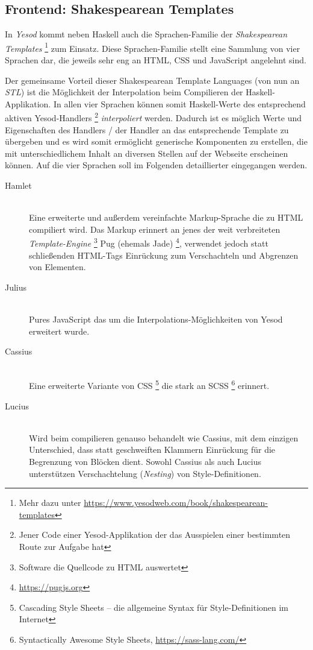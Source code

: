 \documentclass[11pt,a4paper,twoside,ngerman]{article}
\begin{document}
\subsection{Frontend: Shakespearean Templates}
In \emph{Yesod} kommt neben Haskell auch die Sprachen-Familie der \emph{Shakespearean Templates} \footnote{Mehr dazu unter \url{https://www.yesodweb.com/book/shakespearean-templates}} zum Einsatz. Diese Sprachen-Familie stellt eine Sammlung von vier Sprachen dar, die jeweils sehr eng an HTML, CSS und JavaScript angelehnt sind.

Der gemeinsame Vorteil dieser Shakespearean Template Languages (von nun an \emph{STL}) ist die Möglichkeit der Interpolation beim Compilieren der Haskell-Applikation. In allen vier Sprachen können somit Haskell-Werte des entsprechend aktiven Yesod-Handlers \footnote{Jener Code einer Yesod-Applikation der das Ausspielen einer bestimmten Route zur Aufgabe hat} \emph{interpoliert} werden. Dadurch ist es möglich Werte und Eigenschaften des Handlers / der Handler an das entsprechende Template zu übergeben und es wird somit ermöglicht generische Komponenten zu erstellen, die mit unterschiedlichem Inhalt an diversen Stellen auf der Webseite erscheinen können. Auf die vier Sprachen soll im Folgenden detaillierter eingegangen werden.

\begin{description}
    \item[Hamlet] \hfill \\ Eine erweiterte und außerdem vereinfachte Markup-Sprache die zu HTML compiliert wird. Das Markup erinnert an jenes der weit verbreiteten \emph{Template-Engine} \footnote{Software die Quellcode zu HTML auswertet} Pug (ehemals Jade) \footnote{\url{https://pugjs.org}}, verwendet jedoch statt schließenden HTML-Tags Einrückung zum Verschachteln und Abgrenzen von Elementen.
    \item[Julius] \hfill \\ Pures JavaScript das um die Interpolations-Möglichkeiten von Yesod erweitert wurde.
    \item[Cassius] \hfill \\ Eine erweiterte Variante von CSS \footnote{Cascading Style Sheets -- die allgemeine Syntax für Style-Definitionen im Internet} die stark an SCSS \footnote{Syntactically Awesome Style Sheets, \url{https://sass-lang.com/}} erinnert.
    \item[Lucius] \hfill \\ Wird beim compilieren genauso behandelt wie Cassius, mit dem einzigen Unterschied, dass statt geschweiften Klammern Einrückung für die Begrenzung von Blöcken dient. Sowohl Cassius als auch Lucius unterstützen Verschachtelung (\emph{Nesting}) von Style-Definitionen.
\end{description}
\end{document}
